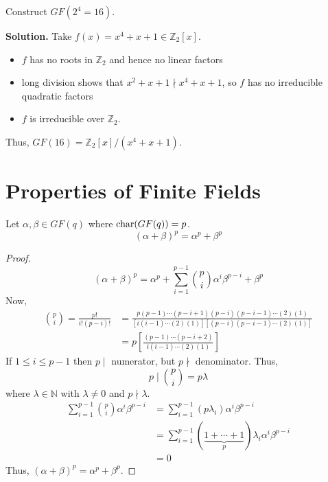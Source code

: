 
\begin{exbox}
    \begin{example}
        Construct $ GF(2^4=16) $.

        \textbf{Solution.} Take $ f(x)=x^4+x+1\in\mathbb{Z}_2[x] $.
        \begin{itemize}
            \item $ f $ has no roots in $ \mathbb{Z}_2 $ and hence no linear factors
            \item long division shows that $ x^2+x+1\nmid x^4+x+1 $, so $ f $
                  has no irreducible quadratic factors
            \item $ f $ is irreducible over $ \mathbb{Z}_2 $.
        \end{itemize}
        Thus, $ GF(16)=\mathbb{Z}_2[x]/(x^4+x+1) $.
    \end{example}
\end{exbox}

\section{Properties of Finite Fields}
\begin{thmbox}
    \begin{theorem}
        Let $ \alpha,\beta\in GF(q) $ where $ \operatorname{char}(GF(q))=p $.
        \[ (\alpha + \beta)^p=\alpha^p+\beta^p \]
    \end{theorem}
\end{thmbox}

\begin{proof}
    \[ (\alpha + \beta)^p=\alpha^p+\sum\limits_{i=1}^{p-1}
        \binom{p}{i}\alpha^i\beta^{p-i}+\beta^p \]
    Now,
    \begin{align*}
        \binom{p}{i}=\frac{p!}{i!(p-i)!}
         & =\frac{p(p-1)\cdots (p-i+1)(p-i)(p-i-1)\cdots (2)(1)}{\left[i(i-1)\cdots(2)(1)\right]\left[(p-i)(p-i-1)\cdots(2)(1)\right]} \\
         & =p\left[\frac{(p-1)\cdots (p-i+2)}{i(i-1)\cdots(2)(1)}\right]
    \end{align*}
    If $ 1\leqslant i\leqslant p-1 $ then $ p\mid $ numerator, but
    $ p \nmid $ denominator. Thus,
    \[ p\mid \binom{p}{i}=p\lambda \]
    where $ \lambda\in\mathbb{N} $ with $ \lambda \neq 0 $ and $ p\nmid \lambda $.
    \begin{align*}
        \sum\limits_{i=1}^{p-1}\binom{p}{i}\alpha^i\beta^{p-i}
         & = \sum\limits_{i=1}^{p-1} (p\lambda_i) \alpha^i\beta^{p-i}                          \\
         & =\sum\limits_{i=1}^{p-1} (\underbrace{1+\cdots+1}_{p})\lambda_i \alpha^i\beta^{p-i} \\
         & =0
    \end{align*}
    Thus, $ (\alpha + \beta)^p=\alpha^p+\beta^p $.
\end{proof}

